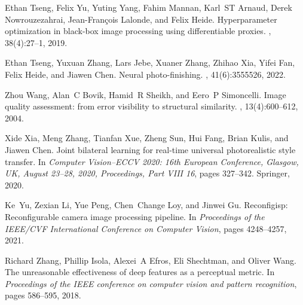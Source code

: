 \documentclass{article}
\begin{document}
\begin{thebibliography}{10}
Ethan Tseng, Felix Yu, Yuting Yang, Fahim Mannan, Karl~ST Arnaud, Derek Nowrouzezahrai, Jean-Fran{\c{c}}ois Lalonde, and Felix Heide.
\newblock Hyperparameter optimization in black-box image processing using differentiable proxies.
, 38(4):27--1, 2019.

Ethan Tseng, Yuxuan Zhang, Lars Jebe, Xuaner Zhang, Zhihao Xia, Yifei Fan, Felix Heide, and Jiawen Chen.
\newblock Neural photo-finishing.
, 41(6):3555526, 2022.

Zhou Wang, Alan~C Bovik, Hamid~R Sheikh, and Eero~P Simoncelli.
\newblock Image quality assessment: from error visibility to structural similarity.
, 13(4):600--612, 2004.

Xide Xia, Meng Zhang, Tianfan Xue, Zheng Sun, Hui Fang, Brian Kulis, and Jiawen Chen.
\newblock Joint bilateral learning for real-time universal photorealistic style transfer.
\newblock In {\em Computer Vision--ECCV 2020: 16th European Conference, Glasgow, UK, August 23--28, 2020, Proceedings, Part VIII 16}, pages 327--342. Springer, 2020.

Ke~Yu, Zexian Li, Yue Peng, Chen~Change Loy, and Jinwei Gu.
\newblock Reconfigisp: Reconfigurable camera image processing pipeline.
\newblock In {\em Proceedings of the IEEE/CVF International Conference on Computer Vision}, pages 4248--4257, 2021.

Richard Zhang, Phillip Isola, Alexei~A Efros, Eli Shechtman, and Oliver Wang.
\newblock The unreasonable effectiveness of deep features as a perceptual metric.
\newblock In {\em Proceedings of the IEEE conference on computer vision and pattern recognition}, pages 586--595, 2018.

\end{thebibliography}



\clearpage

\end{document}
